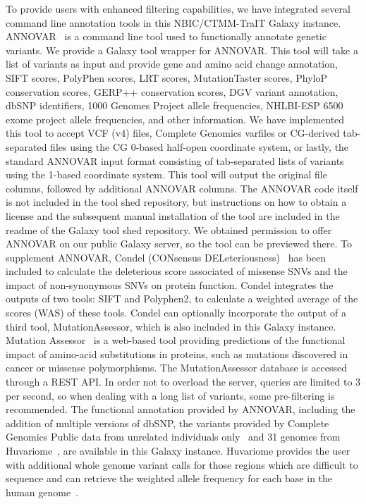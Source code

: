 To provide users with enhanced filtering capabilities, we have integrated several command line annotation tools in this NBIC/CTMM-TraIT Galaxy instance. ANNOVAR~\cite{annovar} is a command line tool used to functionally annotate genetic variants. We provide a Galaxy tool wrapper for ANNOVAR\@. This tool will take a list of variants as input and provide gene and amino acid change annotation, SIFT scores, PolyPhen scores, LRT scores, MutationTaster scores, PhyloP conservation scores, GERP++ conservation scores, DGV variant annotation, dbSNP identifiers, 1000 Genomes Project allele frequencies, NHLBI-ESP 6500 exome project allele frequencies, and other information. We have implemented this tool to accept VCF (v4) files, Complete Genomics varfiles or CG-derived tab-separated files using the CG 0-based half-open coordinate system, or lastly, the standard ANNOVAR input format consisting of tab-separated lists of variants using the 1-based coordinate system. This tool will output the original file columns, followed by additional ANNOVAR columns. The ANNOVAR code itself is not included in the tool shed repository, but instructions on how to obtain a license and the subsequent manual installation of the tool are included in the readme of the Galaxy tool shed repository. We obtained permission to offer ANNOVAR on our public Galaxy server, so the tool can be previewed there. To supplement ANNOVAR, Condel (CONsensus DELeteriousness)~\cite{condel} has been included to calculate the deleterious score associated of missense SNVs and the impact of non-synonymous SNVs on protein function. Condel integrates the outputs of two tools: SIFT and Polyphen2, to calculate a weighted average of the scores (WAS) of these tools. Condel can optionally incorporate the output of a third tool, MutationAssessor, which is also included in this Galaxy instance. Mutation Assessor~\cite{mutass} is a web-based tool providing predictions of the functional impact of amino-acid substitutions in proteins, such as mutations discovered in cancer or missense polymorphisms. The MutationAssessor database is accessed through a REST API\@. In order not to overload the server, queries are limited to 3 per second, so when dealing with a long list of variants, some pre-filtering is recommended. The functional annotation provided by ANNOVAR, including the addition of multiple versions of dbSNP, the variants provided by Complete Genomics Public data from unrelated individuals only~\cite{url-cgftp} and 31 genomes from Huvariome~\cite{huvariome}, are available in this Galaxy instance. Huvariome provides the user with additional whole genome variant calls for those regions which are difficult to sequence and can retrieve the weighted allele frequency for each base in the human genome~\cite{huvariome}.



